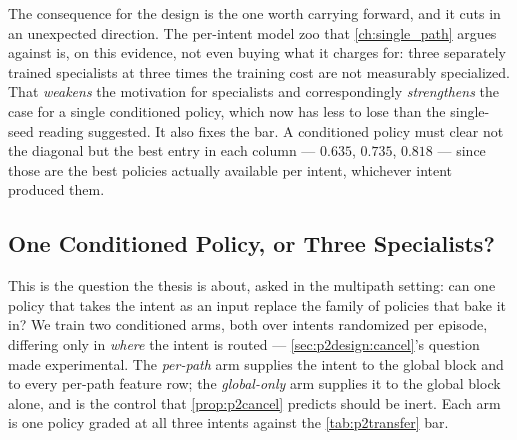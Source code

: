 The consequence for the design is the one worth carrying forward, and it cuts in an unexpected
direction. The per-intent model zoo that \cref{ch:single_path} argues against is, on this evidence, not
even buying what it charges for: three separately trained specialists at three times the training cost
are not measurably specialized. That \emph{weakens} the motivation for specialists and correspondingly
\emph{strengthens} the case for a single conditioned policy, which now has less to lose than the
single-seed reading suggested. It also fixes the bar. A conditioned policy must clear not the diagonal
but the best entry in each column --- $0.635$, $0.735$, $0.818$ --- since those are the best policies
actually available per intent, whichever intent produced them.

\subsection{One Conditioned Policy, or Three Specialists?}
\label{sec:p2eval:conditioning}

This is the question the thesis is about, asked in the multipath setting: can one policy that takes the
intent as an input replace the family of policies that bake it in? We train two conditioned arms, both
over intents randomized per episode, differing only in \emph{where} the intent is routed ---
\cref{sec:p2design:cancel}'s question made experimental. The \emph{per-path} arm supplies the intent to
the global block and to every per-path feature row; the \emph{global-only} arm supplies it to the global
block alone, and is the control that \cref{prop:p2cancel} predicts should be inert. Each arm is one
policy graded at all three intents against the \cref{tab:p2transfer} bar.


